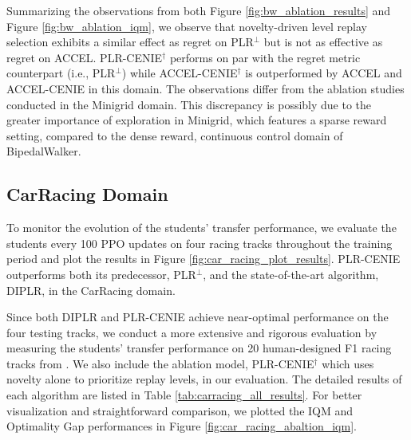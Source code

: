 Summarizing the observations from both Figure \ref{fig:bw_ablation_results} and Figure \ref{fig:bw_ablation_iqm}, we observe that novelty-driven level replay selection exhibits a similar effect as regret on PLR$^\perp$ but is not as effective as regret on ACCEL. PLR-CENIE$^\dag$ performs on par with the regret metric counterpart (i.e., PLR$^\perp$) while ACCEL-CENIE$^\dag$ is outperformed by ACCEL and ACCEL-CENIE in this domain. The observations differ from the ablation studies conducted in the Minigrid domain. This discrepancy is possibly due to the greater importance of exploration in Minigrid, which features a sparse reward setting, compared to the dense reward, continuous control domain of BipedalWalker.

\subsection{CarRacing Domain}
To monitor the evolution of the students' transfer performance, we evaluate the students every 100 PPO updates on four racing tracks throughout the training period and plot the results in Figure \ref{fig:car_racing_plot_results}. PLR-CENIE outperforms both its predecessor, PLR$^\perp$, and the state-of-the-art algorithm, DIPLR, in the CarRacing domain. 

Since both DIPLR and PLR-CENIE achieve near-optimal performance on the four testing tracks, we conduct a more extensive and rigorous evaluation by measuring the students' transfer performance on 20 human-designed F1 racing tracks from \citet{jiang2021replay}. We also include the ablation model, PLR-CENIE$^\dag$ which uses novelty alone to prioritize replay levels, in our evaluation. The detailed results of each algorithm are listed in Table \ref{tab:carracing_all_results}. For better visualization and straightforward comparison, we plotted the IQM and Optimality Gap performances in Figure \ref{fig:car_racing_abaltion_iqm}.

